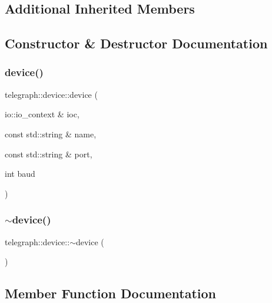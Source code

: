 \subsection*{Additional Inherited Members}


\subsection{Constructor \& Destructor Documentation}
\mbox{\label{classtelegraph_1_1device_a439a2eae3e8fceab20e87dea027dd912}} 
\subsubsection{\texorpdfstring{device()}{device()}}
{\footnotesize\ttfamily telegraph\+::device\+::device (\begin{DoxyParamCaption}\item[{io\+::io\+\_\+context \&}]{ioc,  }\item[{const std\+::string \&}]{name,  }\item[{const std\+::string \&}]{port,  }\item[{int}]{baud }\end{DoxyParamCaption})}

\mbox{\label{classtelegraph_1_1device_a55d99b0a3df689b60480a54ebaab6a44}} 
\subsubsection{\texorpdfstring{$\sim$device()}{~device()}}
{\footnotesize\ttfamily telegraph\+::device\+::$\sim$device (\begin{DoxyParamCaption}{ }\end{DoxyParamCaption})}



\subsection{Member Function Documentation}
\mbox{\label{classtelegraph_1_1device_ac6558ddeed4799f4d69428863363a1e6}} 
